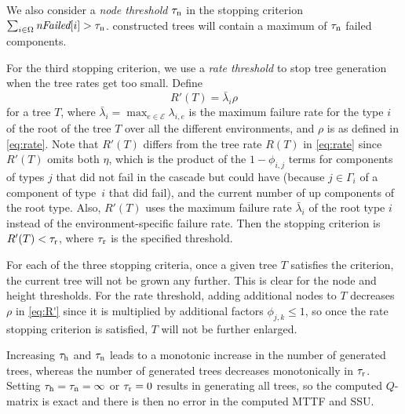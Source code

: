 \documentclass[12pt]{article}
\newcommand{\changed}[1]{#1}
\newcommand{\changed}[1]{\textcolor{red}{#1}}
\newcommand{\varName}[1]{\textrm{\it#1}}
\begin{document}
We also consider a \textit{node threshold}
\changed{$\tau_{\textrm n}$}
in the stopping criterion $\sum_{i \in \Omega} \varName{nFailed}[i] >
\tau_{\textrm n}$. %
constructed trees will contain a maximum of $\tau_{\textrm n}$ failed
components.

For the third stopping criterion, we use a \textit{rate threshold}
\changed{to stop tree generation when the tree rates get too small}. Define
\begin{equation}
\label{eq:R'}
R'(T) = \bar{\lambda}_i \rho
\end{equation}
for a tree $T$, where $\bar{\lambda}_i = \max_{e \in \mathcal{E}}
\lambda_{i,e}$ is the maximum failure rate for the type $i$ of the root of the
tree $T$ over all the different environments, and $\rho$ is as defined in
\eqref{eq:rate}. Note that $R'(T)$ differs from the tree rate $R(T)$ in
\eqref{eq:rate} since $R'(T)$ omits
\changed{both} $\eta$, which is the product of the $1-\phi_{i,j}$ terms for
components of types $j$ that did not fail in the cascade but could have
(because $j \in \Gamma_i$ of a component of type~$i$ that did fail), and the
current number of up components of the root type. %
\changed{Also, $R'(T)$ uses the maximum
failure rate $\bar{\lambda}_i$ of the root type $i$ instead of the
environment-specific failure rate.} Then the stopping criterion is $R'(T) <
\changed{\tau_{\textrm r}}$, where $\tau_{\textrm r}$ is the specified
threshold.

\changed{
For each of the three stopping criteria, once a given tree $T$ satisfies the
criterion, the current tree will not be grown any further. This is clear for
the node and height thresholds. For the rate threshold, adding additional
nodes to $T$ decreases $\rho$ in \eqref{eq:R'} since it is multiplied by
additional factors $\phi_{j,k} \leq 1$, so once the rate stopping criterion is
satisfied, $T$ will not be further enlarged.}



Increasing $\tau_{\textrm h}$ and $\tau_{\textrm n}$
leads to a
monotonic increase in the number of
generated trees, whereas the number of generated trees decreases monotonically
in $\tau_{\textrm r}$. Setting
$\tau_{\textrm h} = \tau_{\textrm n} = \infty$
or $\tau_{\textrm r} = 0$ results in
generating all trees,
\changed{so the computed $Q$-matrix is exact and}
there is then no error in the
computed MTTF and SSU.
\end{document}
